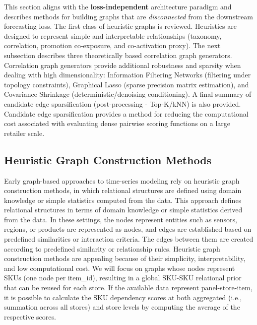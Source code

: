 This section aligns with the \textbf{loss-independent} architecture paradigm and describes methods for building graphs that are \emph{disconnected} from the downstream forecasting loss. The first class of heuristic graphs is reviewed. Heuristics are designed to represent simple and interpretable relationships (taxonomy, correlation, promotion co-exposure, and co-activation proxy). The next subsection describes three theoretically based correlation graph generators. Correlation graph generators provide additional robustness and sparsity when dealing with high dimensionality: Information Filtering Networks (filtering under topology constraints), Graphical Lasso (sparse precision matrix estimation), and Covariance Shrinkage (deterministic/denoising conditioning). A final summary of candidate edge sparsification (post-processing - Top-K/kNN) is also provided. Candidate edge sparsification provides a method for reducing the computational cost associated with evaluating dense pairwise scoring functions on a large retailer scale.

\subsection{Heuristic Graph Construction Methods}
\label{sec:heuristic_graphs}




Early graph-based approaches to time-series modeling rely on heuristic graph construction methods, in which relational structures are defined using domain knowledge or simple statistics computed from the data. This approach defines relational structures in terms of domain knowledge or simple statistics derived from the data. In these settings, the nodes represent entities such as sensors, regions, or products are represented as nodes, and edges are established based on predefined similarities or interaction criteria.  The edges between them are created according to predefined similarity or relationship rules. Heuristic graph construction methods are appealing because of their simplicity, interpretability, and low computational cost. We will focus on graphs whose nodes represent SKUs (one node per item\_id), resulting in a global SKU-SKU relational prior that can be reused for each store. If the available data represent panel-store-item, it is possible to calculate the SKU dependency scores at both aggregated (i.e., summation across all stores) and store levels by computing the average of the respective scores.

